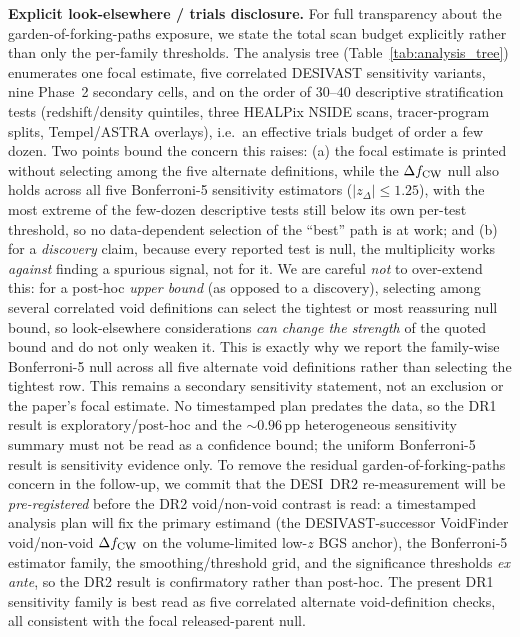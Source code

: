 \documentclass[aps,prd,twocolumn,superscriptaddress,showpacs,preprintnumbers,nofootinbib,longbibliography,floatfix]{revtex4-2}
\begin{document}
\textbf{Explicit look-elsewhere / trials disclosure.} For full
transparency about the garden-of-forking-paths exposure, we state the
total scan budget explicitly rather than only the per-family thresholds.
The analysis tree (Table~\ref{tab:analysis_tree}) enumerates one focal
estimate, five correlated DESIVAST sensitivity variants, nine Phase~2
secondary cells, and on the order
of $30$--$40$ descriptive stratification tests (redshift/density
quintiles, three HEALPix NSIDE scans, tracer-program splits, Tempel/ASTRA
overlays), i.e.\ an effective trials budget of order a few dozen. Two
points bound the concern this raises: (a) the focal estimate is printed
without selecting among the five alternate definitions, while the
$\Delta f_{\rm CW}$ null also holds across all five Bonferroni-5
sensitivity estimators ($|z_\Delta|\!\le\!1.25$), with the most extreme of the few-dozen
descriptive tests still below its own per-test threshold, so no
data-dependent selection of the ``best'' path is at work; and (b) for a
\emph{discovery} claim, because every reported test is null, the
multiplicity works \emph{against} finding a spurious signal, not for it.
We are careful \emph{not} to over-extend this: for a post-hoc
\emph{upper bound} (as opposed to a discovery), selecting among several
correlated void definitions can select the tightest or most reassuring
null bound, so look-elsewhere considerations \emph{can change the
strength} of the quoted bound and do not only weaken it. This is exactly
why we report the family-wise Bonferroni-5 null across all five alternate
void definitions rather than selecting the tightest row. This remains a
secondary sensitivity statement, not an exclusion or the paper's focal
estimate. No timestamped plan predates the data, so the DR1 result is
exploratory/post-hoc and the ${\sim}0.96$\,pp heterogeneous sensitivity
summary must not be read as a confidence bound;
the uniform Bonferroni-5 result is sensitivity evidence only. To remove the residual
garden-of-forking-paths concern in the follow-up, we commit that the
DESI~DR2 re-measurement will be \emph{pre-registered} before the DR2
void/non-void contrast is read: a timestamped analysis plan will fix the
primary estimand (the DESIVAST-successor VoidFinder void/non-void
$\Delta f_{\rm CW}$ on the volume-limited low-$z$ BGS anchor), the
Bonferroni-5 estimator family, the smoothing/threshold grid, and the
significance thresholds \emph{ex ante}, so the DR2 result is confirmatory
rather than post-hoc. The present DR1 sensitivity family is best read as
five correlated alternate void-definition checks, all consistent with
the focal released-parent null.
\end{document}
